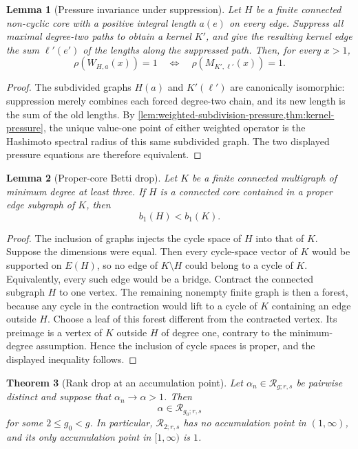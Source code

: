 \documentclass[11pt]{amsart}
\theoremstyle{plain}
\newtheorem{theorem}{Theorem}[section]
\newtheorem{lemma}[theorem]{Lemma}
\theoremstyle{definition}
\theoremstyle{remark}
\begin{document}
\begin{lemma}[Pressure invariance under suppression]
\label{lem:pressure-suppression}
Let \(H\) be a finite connected non-cyclic core with a positive integral
length \(a(e)\) on every edge.  Suppress all maximal degree-two paths to
obtain a kernel \(K'\), and give the resulting kernel edge the sum
\(\ell'(e')\) of the lengths along the suppressed path.  Then, for every
\(x>1\),
\[
  \rho\!\left(W_{H,a}(x)\right)=1
  \quad\Longleftrightarrow\quad
  \rho\!\left(M_{K',\ell'}(x)\right)=1.
\]
\end{lemma}

\begin{proof}
The subdivided graphs \(H(a)\) and \(K'(\ell')\) are canonically
isomorphic: suppression merely combines each forced degree-two chain, and
its new length is the sum of the old lengths.  By
\cref{lem:weighted-subdivision-pressure,thm:kernel-pressure}, the unique
value-one point of either weighted operator is the Hashimoto spectral
radius of this same subdivided graph.  The two displayed pressure equations
are therefore equivalent.
\end{proof}

\begin{lemma}[Proper-core Betti drop]
\label{lem:proper-core-betti-drop}
Let \(K\) be a finite connected multigraph of minimum degree at least three.
If \(H\) is a connected core contained in a proper edge subgraph of \(K\),
then
\[
  b_1(H)<b_1(K).
\]
\end{lemma}

\begin{proof}
The inclusion of graphs injects the cycle space of \(H\) into that of \(K\).
Suppose the dimensions were equal.  Then every cycle-space vector of \(K\)
would be supported on \(E(H)\), so no edge of \(K\setminus H\) could belong to
a cycle of \(K\).  Equivalently, every such edge would be a bridge.  Contract
the connected subgraph \(H\) to one vertex.  The remaining nonempty finite
graph is then a forest, because any cycle in the contraction would lift to a
cycle of \(K\) containing an edge outside \(H\).  Choose a leaf of this forest
different from the contracted vertex.  Its preimage is a vertex of \(K\)
outside \(H\) of degree one, contrary to the minimum-degree assumption.
Hence the inclusion of cycle spaces is proper, and the displayed inequality
follows.
\end{proof}

\begin{theorem}[Rank drop at an accumulation point]
\label{thm:rank-drop}
Let \(\alpha_n\in\mathcal R_{g;r,s}\) be pairwise distinct and suppose that
\(\alpha_n\to\alpha>1\).  Then
\[
  \alpha\in\mathcal R_{g_0;r,s}
\]
for some \(2\leq g_0<g\).  In particular,
\(\mathcal R_{2;r,s}\) has no accumulation point in \((1,\infty)\), and its
only accumulation point in \([1,\infty)\) is \(1\).
\end{theorem}
\end{document}
